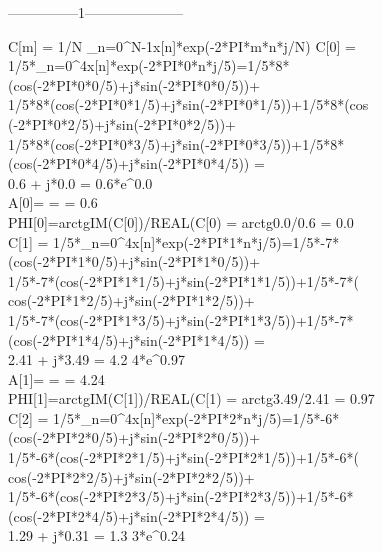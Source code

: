 \documentclass[landscape,12pt]{article}
\begin{document}
\pagecolor{white}
\pagestyle{plain}
















\begin{center}
---------------1---------------------
\end{center}

C[m] = 1/N \sum_{n=0}^{N-1}{x[n]*exp(-2*PI*m*n*j/N)}
C[0] = 1/5*\sum_{n=0}^{4}{x[n]*exp(-2*PI*0*n*j/5)}=1/5*8*(cos(-2*PI*0*0/5)+j*sin(-2*PI*0*0/5))+\\1/5*8*(cos(-2*PI*0*1/5)+j*sin(-2*PI*0*1/5))+1/5*8*(cos
(-2*PI*0*2/5)+j*sin(-2*PI*0*2/5))+\\1/5*8*(cos(-2*PI*0*3/5)+j*sin(-2*PI*0*3/5))+1/5*8*(cos(-2*PI*0*4/5)+j*sin(-2*PI*0*4/5)) =\\ 0.6 + j*0.0 = 0.6*e^{0.0
}\\

A[0]=\sqrt{REAL(C[0])^2+IM(C[0)^2} =  = 0.6\\
PHI[0]=arctg{IM(C[0])/REAL(C[0)} = arctg{0.0/0.6} = 0.0\\

C[1] = 1/5*\sum_{n=0}^{4}{x[n]*exp(-2*PI*1*n*j/5)}=1/5*-7*(cos(-2*PI*1*0/5)+j*sin(-2*PI*1*0/5))+\\1/5*-7*(cos(-2*PI*1*1/5)+j*sin(-2*PI*1*1/5))+1/5*-7*(
cos(-2*PI*1*2/5)+j*sin(-2*PI*1*2/5))+\\1/5*-7*(cos(-2*PI*1*3/5)+j*sin(-2*PI*1*3/5))+1/5*-7*(cos(-2*PI*1*4/5)+j*sin(-2*PI*1*4/5)) =\\ 2.41 + j*3.49 = 4.2
4*e^{0.97}\\

A[1]=\sqrt{REAL(C[1])^2+IM(C[1)^2} =  = 4.24\\
PHI[1]=arctg{IM(C[1])/REAL(C[1)} = arctg{3.49/2.41} = 0.97\\

C[2] = 1/5*\sum_{n=0}^{4}{x[n]*exp(-2*PI*2*n*j/5)}=1/5*-6*(cos(-2*PI*2*0/5)+j*sin(-2*PI*2*0/5))+\\1/5*-6*(cos(-2*PI*2*1/5)+j*sin(-2*PI*2*1/5))+1/5*-6*(
cos(-2*PI*2*2/5)+j*sin(-2*PI*2*2/5))+\\1/5*-6*(cos(-2*PI*2*3/5)+j*sin(-2*PI*2*3/5))+1/5*-6*(cos(-2*PI*2*4/5)+j*sin(-2*PI*2*4/5)) = \\1.29 + j*0.31 = 1.3
3*e^{0.24}\\
\end{document}
